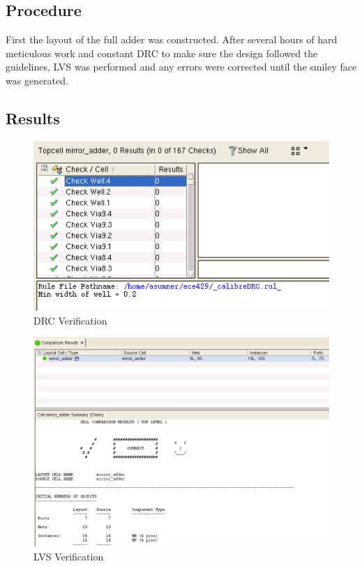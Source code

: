 \documentclass[12pt]{article}
\begin{document}
\subsection{Procedure}
First the layout of the full adder was constructed. After several hours of hard meticulous work and constant DRC to make sure the design followed the guidelines, LVS was performed and any errors were corrected until the smiley face was generated. 
\subsection{Results}
\begin{figure}[H]
\centering
\includegraphics[width=1\linewidth]{drc}
\caption{DRC Verification}
\label{fig:drc}
\end{figure}

\begin{figure}[H]
\centering
\includegraphics[width=1\linewidth]{lvs}
\caption{LVS Verification}
\label{fig:lvs}
\end{figure}
\end{document}
